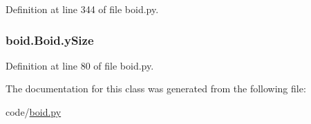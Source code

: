 Definition at line 344 of file boid.\-py.

\hypertarget{classboid_1_1Boid_a09f8fe6b2deb64fd65cfd64fc01470b9}{
\subsubsection[{y\-Size}]{\setlength{\rightskip}{0pt plus 5cm}boid.\-Boid.\-y\-Size}}\label{classboid_1_1Boid_a09f8fe6b2deb64fd65cfd64fc01470b9}


Definition at line 80 of file boid.\-py.



The documentation for this class was generated from the following file\-:\begin{DoxyCompactItemize}
\item 
code/\hyperlink{boid_8py}{boid.\-py}\end{DoxyCompactItemize}
